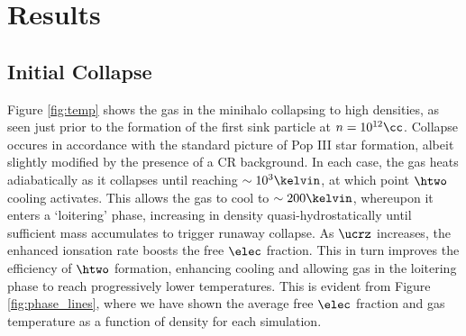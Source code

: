 \section{Results}
\label{sec:results}
\subsection{Initial Collapse}
\label{sec:initial_collapse}

Figure \ref{fig:temp} shows the gas in the minihalo collapsing to high densities, as seen just prior to the formation of the first sink particle at $n=10^{12}\cc$.  Collapse occures in accordance with the standard picture of Pop III star formation, albeit slightly modified by the presence of a CR background.  In each case, the gas heats adiabatically as it collapses until reaching $\sim10^3\kelvin$, at which point $\htwo$ cooling activates.  This allows the gas to cool to $\sim200\kelvin$, whereupon it enters a `loitering' phase, increasing in density quasi-hydrostatically until sufficient mass accumulates to trigger runaway collapse.  As $\ucrz$ increases, the enhanced ionsation rate boosts the free $\elec$ fraction.  This in turn improves the efficiency of $\htwo$ formation, enhancing cooling and allowing gas in the loitering phase to reach progressively lower temperatures.  This is evident from Figure \ref{fig:phase_lines}, where we have shown the average free $\elec$ fraction and gas temperature as a function of density for each simulation.

